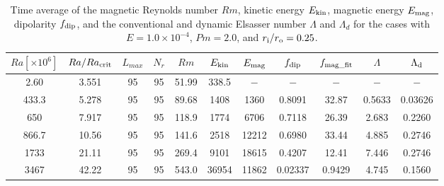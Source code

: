 \begin{table}
{\color{red}
\caption{Time average of the magnetic Reynolds number $Rm$, kinetic energy $E_{\rm kin}$, magnetic energy $E_{\rm mag}$, dipolarity $f_{\rm dip}$, and  the conventional and dynamic Elsasser number $\Lambda$ and $\Lambda_{d}$ for the cases with $E = 1.0 \times 10^{-4}$, $Pm = 2.0$, and $r_{\rm i}/r_{\rm o} = 0.25$.}
}
{\color{red}
  \begin{tabular}{ccccccccccc}
    \hline
     $Ra[\times 10^6]$  &  $Ra/Ra_{\rm crit}$& 
     $L_{max}$ & $N_{r}$ & $Rm$ 
     & $E_{\rm kin}$  &  $E_{\rm mag}$ & $f_{\rm dip}$ & $f_{\rm mag\_fit}$ & $\Lambda$ & $\Lambda_{\rm d}$\\
    \hline
      2.60 & 3.551 & 95 & 95 & 51.99 & 338.5 & $-$ & $-$ & $-$ & $-$ & $-$ \\
      433.3 & 5.278 & 95 & 95 & 89.68 & 1408 & 1360 & 0.8091 & 32.87 & 0.5633 & 0.03626 \\
      650 & 7.917 & 95 & 95 & 118.9 & 1774 & 6706 & 0.7118 & 26.39 & 2.683 & 0.2260 \\
      866.7 & 10.56 & 95 & 95 & 141.6 & 2518 & 12212 & 0.6980 & 33.44 & 4.885 & 0.2746 \\
      1733 & 21.11 & 95 & 95 & 269.4 & 9101 & 18615 & 0.4207 & 12.41 & 7.446 & 0.2746 \\
      3467 & 42.22 & 95 & 95 & 543.0 & 36954 & 11862 & 0.02337 & 0.9429 & 4.745 & 0.1560 \\
    \hline
  \end{tabular}
 }
\label{table:Summary_25_Ek4}
\end{table}
%
%
